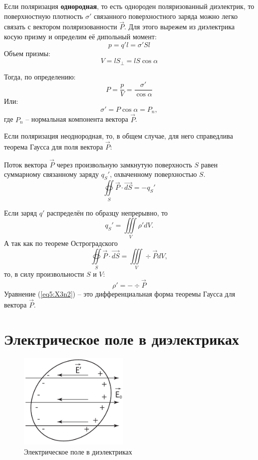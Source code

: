     Если поляризация \textbf{однородная}, то есть однороден поляризованный
    диэлектрик, то поверхностную плотность \( \sigma' \) связанного
    поверхностного заряда можно легко связать с вектором поляризованности
    \( \vec{P} \). Для этого вырежем из диэлектрика косую призму и определим её
    дипольный момент:
    \[
        p = q' l = \sigma' Sl
    \]
    Объем призмы:
    \[
        V = lS_{\perp} = lS\cos\alpha
    \]
    
    Тогда, по определению:
    \[
        P = \frac{p}{V} = \frac{\sigma'}{\cos\alpha}
    \]
    Или:
    \begin{equation}
        \sigma' = P\cos\alpha = P_n,
    \end{equation}
    где \( P_n \) -- нормальная компонента вектора \( \vec{P} \).
    
    Если поляризация неоднородная, то, в общем случае, для него справедлива
    теорема Гаусса для поля вектора \( \vec{P} \):
    \begin{theorem}
        Поток вектора \( \vec{P} \) через произвольную замкнутую поверхность
        \( S \) равен суммарному связанному заряду \( q_S' \), охваченному
        поверхностью \( S \).
        \begin{equation}
            \oiint\limits_S \vec{P}\cdot\vec{dS} = -q_S' \label{eq5:X3n1}
        \end{equation}
    \end{theorem}
    
    
    Если заряд \( q' \) распределён по образцу непрерывно, то
    \[
        q_S' = \iiint\limits_V \rho' dV.
    \]
    А так как по теореме Остроградского
    \[
        \oiint\limits_S \vec{P}\cdot\vec{dS} = \iiint\limits_V \div\vec{P}dV,
    \]
    то, в силу произвольности \( S \) и \( V \):
    \begin{equation}
        \rho' = -\div\vec{P} \label{eq5:X3n2}
    \end{equation}
    Уравнение (\ref{eq5:X3n2}) -- это дифференциальная форма теоремы Гаусса для
    вектора \( \vec{P} \).
    
\section{Электрическое поле в диэлектриках}
    
    \begin{figure}[b!]
        \center
        \includegraphics[width=0.47\textwidth]{lec05/E_and_isolator.pdf}
        \caption{Электрическое поле в диэлектриках}
    \end{figure}

